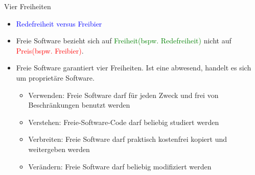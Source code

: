 \begin{frame}{Vier Freiheiten}
\begin{itemize}
\item \textcolor{blue}{Redefreiheit versus Freibier}\pause\\
\item Freie Software bezieht sich auf \textcolor{green}{Freiheit(bspw. Redefreiheit)} nicht auf \textcolor{red}{Preis(bspw. Freibier)}.\pause\\
\item Freie Software garantiert vier Freiheiten. Ist eine abwesend, handelt es sich um proprietäre Software.
\begin{itemize}
\item Verwenden: Freie Software darf für jeden Zweck und frei von Beschränkungen benutzt werden
\item Verstehen: Freie-Software-Code darf beliebig studiert werden
\item Verbreiten: Freie Software darf praktisch kostenfrei kopiert und weitergeben werden
\item Verändern: Freie Software darf beliebig modifiziert werden
\end{itemize}
\end{itemize}
\end{frame}


